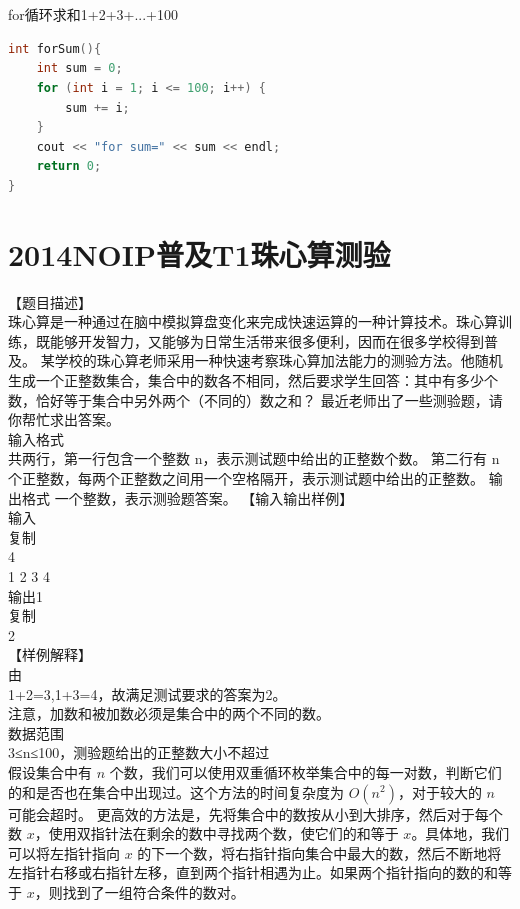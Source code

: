 \documentclass[12pt,twiside,a4paper]{ctexbook}
\numberwithin{chapter}{part}
\begin{document}
\section{}
for循环求和1+2+3+...+100\\
\begin{lstlisting}[language=C++]
int forSum(){
    int sum = 0;
    for (int i = 1; i <= 100; i++) {
        sum += i;
    }
    cout << "for sum=" << sum << endl;
    return 0;
}
\end{lstlisting}

\section{2014NOIP普及T1珠心算测验}
【题目描述】\\
珠心算是一种通过在脑中模拟算盘变化来完成快速运算的一种计算技术。珠心算训练，既能够开发智力，又能够为日常生活带来很多便利，因而在很多学校得到普及。
某学校的珠心算老师采用一种快速考察珠心算加法能力的测验方法。他随机生成一个正整数集合，集合中的数各不相同，然后要求学生回答：其中有多少个数，恰好等于集合中另外两个（不同的）数之和？
最近老师出了一些测验题，请你帮忙求出答案。\\
输入格式\\
共两行，第一行包含一个整数
n，表示测试题中给出的正整数个数。
第二行有
n个正整数，每两个正整数之间用一个空格隔开，表示测试题中给出的正整数。
输出格式
一个整数，表示测验题答案。
【输入输出样例】\\
输入\\
复制\\
4\\
1 2 3 4\\
输出1\\
复制\\
2\\
【样例解释】\\
由\\
1+2=3,1+3=4，故满足测试要求的答案为2。\\
注意，加数和被加数必须是集合中的两个不同的数。\\
数据范围\\
3≤n≤100，测验题给出的正整数大小不超过\\
假设集合中有 $n$ 个数，我们可以使用双重循环枚举集合中的每一对数，判断它们的和是否也在集合中出现过。这个方法的时间复杂度为 $O(n^2)$，对于较大的 $n$ 可能会超时。
更高效的方法是，先将集合中的数按从小到大排序，然后对于每个数 $x$，使用双指针法在剩余的数中寻找两个数，使它们的和等于 $x$。具体地，我们可以将左指针指向 $x$ 的下一个数，将右指针指向集合中最大的数，然后不断地将左指针右移或右指针左移，直到两个指针相遇为止。如果两个指针指向的数的和等于 $x$，则找到了一组符合条件的数对。
\end{document}
